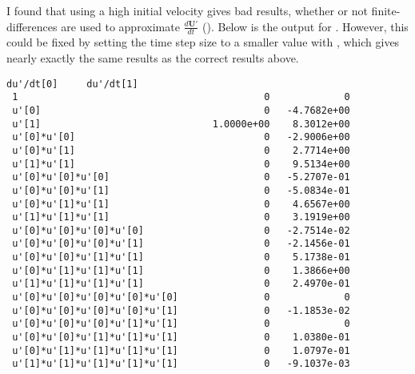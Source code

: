 \documentclass{article}
\let\vec\mathbf
\def\lstinline#1{}%
\begin{document}
I found that using a high initial velocity \lstinline{-v0 -2} gives bad results,
whether or not finite-differences are used to approximate $\frac{d\vec{U'}}{dt}$
(\lstinline{-fd_der}). Below is the output for \lstinline{./pendulum -v0 -2
-fd_der}. However, this could be fixed by setting the time step size to a
smaller value with \lstinline{-dt 0.001}, which gives nearly exactly the same
results as the correct results above.
\begin{lstlisting}[language={}]
                                    du'/dt[0]     du'/dt[1]
 1                                           0             0
 u'[0]                                       0   -4.7682e+00
 u'[1]                              1.0000e+00    8.3012e+00
 u'[0]*u'[0]                                 0   -2.9006e+00
 u'[0]*u'[1]                                 0    2.7714e+00
 u'[1]*u'[1]                                 0    9.5134e+00
 u'[0]*u'[0]*u'[0]                           0   -5.2707e-01
 u'[0]*u'[0]*u'[1]                           0   -5.0834e-01
 u'[0]*u'[1]*u'[1]                           0    4.6567e+00
 u'[1]*u'[1]*u'[1]                           0    3.1919e+00
 u'[0]*u'[0]*u'[0]*u'[0]                     0   -2.7514e-02
 u'[0]*u'[0]*u'[0]*u'[1]                     0   -2.1456e-01
 u'[0]*u'[0]*u'[1]*u'[1]                     0    5.1738e-01
 u'[0]*u'[1]*u'[1]*u'[1]                     0    1.3866e+00
 u'[1]*u'[1]*u'[1]*u'[1]                     0    2.4970e-01
 u'[0]*u'[0]*u'[0]*u'[0]*u'[0]               0             0
 u'[0]*u'[0]*u'[0]*u'[0]*u'[1]               0   -1.1853e-02
 u'[0]*u'[0]*u'[0]*u'[1]*u'[1]               0             0
 u'[0]*u'[0]*u'[1]*u'[1]*u'[1]               0    1.0380e-01
 u'[0]*u'[1]*u'[1]*u'[1]*u'[1]               0    1.0797e-01
 u'[1]*u'[1]*u'[1]*u'[1]*u'[1]               0   -9.1037e-03
\end{lstlisting}
\end{document}
